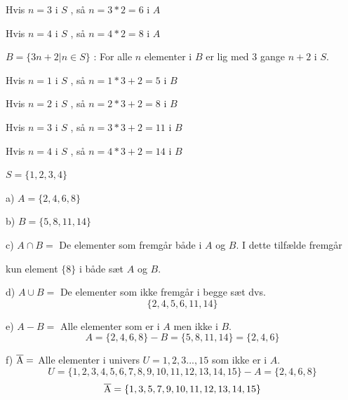 \documentclass{article}
\begin{document}
Hvis $n = 3$ i $S$ , så $n = 3  *  2 = 6$ i $A$
\vspace{10pt}

Hvis $n = 4$ i $S$ , så $n = 4  *  2 = 8$ i $A$
\vspace{10pt}

$   B = {\{3n + 2| n \in S\}}$ : For alle $n$ elementer i $B$ er lig med $3$ gange $n + 2$ i $S$.  
\vspace{10pt}

Hvis $n = 1$ i $S$ , så $n = 1  *  3 + 2 = 5$ i $B$
\vspace{10pt}

Hvis $n = 2$ i $S$ , så $n = 2  *  3 + 2 = 8$ i $B$
\vspace{10pt}

Hvis $n = 3$ i $S$ , så $n = 3  *  3 + 2 = 11$ i $B$
\vspace{12pt}

Hvis $n = 4$ i $S$ , så $n = 4 *  3 + 2 = 14$ i $B$
\vspace{10pt}
\vspace{10pt}

$S = \{1,2,3,4\}$
\vspace{10pt}

\vspace{11pt}

a) $A = \{2, 4, 6, 8\}$ 
\vspace{10pt}

b) $B = \{5, 8, 11, 14\}$ 
\vspace{10pt}

c) $A \cap B = $  De elementer som fremgår både i $A$ og $B$. I dette tilfælde fremgår 

kun element $\{8\}$ i både sæt $A$ og $B$. 

\vspace{10pt}
 d) $A \cup B = $ De elementer som ikke fremgår i begge sæt dvs. $$\{2, 4, 5, 6, 11, 14\}$$
\vspace{10pt}
 
 e) $A - B = $ Alle elementer som er i $A$ men ikke i $B$. $$A=\{2, 4, 6, 8\} - B=\{5, 8, 11, 14\} = \{2,4,6\}$$
 
\vspace{10pt}

 f) $\overline{\rm A}=$ Alle elementer i  univers  $U = {1,2,3...,15}$ som ikke er i $A$. 
 $$U=\{1, 2, 3, 4, 5, 6, 7, 8, 9, 10, 11, 12, 13, 14, 15\} - A =\{2, 4, 6, 8\}$$ $$\overline{\rm A}= \{1, 3, 5, 7, 9, 10, 11, 12, 13, 14, 15\}$$

 \vspace{12pt}
\end{document}
